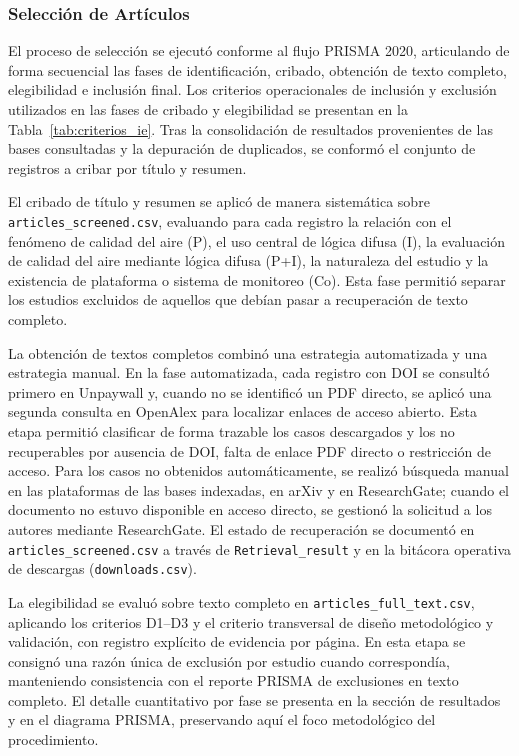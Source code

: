 \subsubsection*{Selección de Artículos}

El proceso de selección se ejecutó conforme al flujo PRISMA 2020, articulando de forma secuencial las fases de identificación, cribado, obtención de texto completo, elegibilidad e inclusión final. Los criterios operacionales de inclusión y exclusión utilizados en las fases de cribado y elegibilidad se presentan en la Tabla~\ref{tab:criterios_ie}. Tras la consolidación de resultados provenientes de las bases consultadas y la depuración de duplicados, se conformó el conjunto de registros a cribar por título y resumen.

El cribado de título y resumen se aplicó de manera sistemática sobre \texttt{articles\_screened.csv}, evaluando para cada registro la relación con el fenómeno de calidad del aire (P), el uso central de lógica difusa (I), la evaluación de calidad del aire mediante lógica difusa (P+I), la naturaleza del estudio y la existencia de plataforma o sistema de monitoreo (Co). Esta fase permitió separar los estudios excluidos de aquellos que debían pasar a recuperación de texto completo.

La obtención de textos completos combinó una estrategia automatizada y una estrategia manual. En la fase automatizada, cada registro con DOI se consultó primero en Unpaywall y, cuando no se identificó un PDF directo, se aplicó una segunda consulta en OpenAlex para localizar enlaces de acceso abierto. Esta etapa permitió clasificar de forma trazable los casos descargados y los no recuperables por ausencia de DOI, falta de enlace PDF directo o restricción de acceso. Para los casos no obtenidos automáticamente, se realizó búsqueda manual en las plataformas de las bases indexadas, en arXiv y en ResearchGate; cuando el documento no estuvo disponible en acceso directo, se gestionó la solicitud a los autores mediante ResearchGate. El estado de recuperación se documentó en \texttt{articles\_screened.csv} a través de \texttt{Retrieval\_result} y en la bitácora operativa de descargas (\texttt{downloads.csv}).

La elegibilidad se evaluó sobre texto completo en \texttt{articles\_full\_text.csv}, aplicando los criterios D1--D3 y el criterio transversal de diseño metodológico y validación, con registro explícito de evidencia por página. En esta etapa se consignó una razón única de exclusión por estudio cuando correspondía, manteniendo consistencia con el reporte PRISMA de exclusiones en texto completo. El detalle cuantitativo por fase se presenta en la sección de resultados y en el diagrama PRISMA, preservando aquí el foco metodológico del procedimiento.
